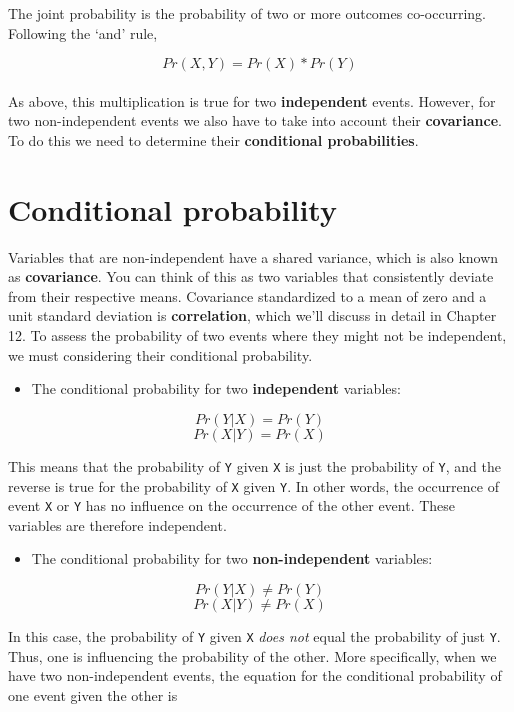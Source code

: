 \documentclass[
]{book}
\providecommand{\tightlist}{%
  \setlength{\itemsep}{0pt}\setlength{\parskip}{0pt}}
\begin{document}
The joint probability is the probability of two or more outcomes co-occurring. Following the `and' rule,

\[Pr(X,Y) = Pr(X) * Pr(Y)\]\\

As above, this multiplication is true for two \textbf{independent} events. However, for two non-independent events we also have to take into account their \textbf{covariance}. To do this we need to determine their \textbf{conditional probabilities}.

\hypertarget{conditional-probability}{%
\section{Conditional probability}\label{conditional-probability}}

Variables that are non-independent have a shared variance, which is also known as \textbf{covariance}. You can think of this as two variables that consistently deviate from their respective means. Covariance standardized to a mean of zero and a unit standard deviation is \textbf{correlation}, which we'll discuss in detail in Chapter 12. To assess the probability of two events where they might not be independent, we must considering their conditional probability.

\begin{itemize}
\tightlist
\item
  The conditional probability for two \textbf{independent} variables:
\end{itemize}

\[Pr(Y|X) = Pr(Y)\]
\[Pr(X|Y) = Pr(X)\]

This means that the probability of \texttt{Y} given \texttt{X} is just the probability of \texttt{Y}, and the reverse is true for the probability of \texttt{X} given \texttt{Y}. In other words, the occurrence of event \texttt{X} or \texttt{Y} has no influence on the occurrence of the other event. These variables are therefore independent.

\begin{itemize}
\tightlist
\item
  The conditional probability for two \textbf{non-independent} variables:
\end{itemize}

\[Pr(Y|X) \neq Pr(Y)\]
\[Pr(X|Y) \neq Pr(X)\]

In this case, the probability of \texttt{Y} given \texttt{X} \emph{does not} equal the probability of just \texttt{Y}. Thus, one is influencing the probability of the other. More specifically, when we have two non-independent events, the equation for the conditional probability of one event given the other is
\end{document}
